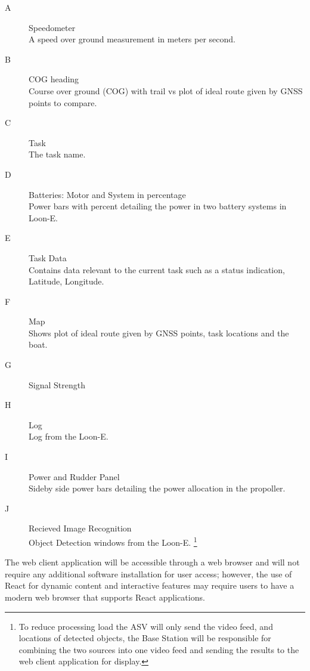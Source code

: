 \begin{description}
	\item[A] Speedometer \\
A speed over ground measurement in meters per second.
	\item[B] COG heading \\
Course over ground (COG) with trail vs plot of ideal route given by GNSS points to compare.
	\item[C] Task \\
The task name.
	\item[D] Batteries: Motor and System in percentage \\
Power bars with percent detailing the power in two battery systems in Loon-E.
	\item[E] Task Data \\
Contains data relevant to the current task such as a status indication, Latitude, Longitude.
	\item[F] Map \\
Shows plot of ideal route given by GNSS points, task locations and the boat.
	\item[G] Signal Strength 
	\item[H] Log \\
Log from the Loon-E.
	\item[I] Power and Rudder Panel \\
Sideby side power bars detailing the power allocation in the propoller. 
	\item[J] Recieved Image Recognition \\
Object Detection windows from the Loon-E.
\footnote{To reduce processing load the ASV will only send the video feed, and locations of detected  objects, the Base Station will be responsible for combining the two sources into one video feed and sending the results to the web client application for display.}
\end{description}

The web client application will be accessible through a web browser and will not require any additional software installation for user access; however, the use of React for dynamic content and interactive features may require users to have a modern web browser that supports React applications. 


